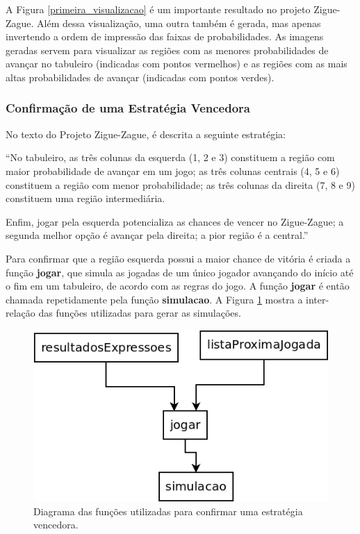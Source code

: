 \documentclass[12pt]{article}
\newcommand{\aspas}[1]{``#1''} %
\newcommand{\citacao}[1]{
	\singlespacing %
	\begin{flushright}
		\begin{minipage}{0.75\linewidth} %
			{\fontsize{10}{\baselineskip}\selectfont \aspas{#1}}
		\end{minipage}
	\end{flushright}
	\onehalfspacing %
}
\begin{document}
A Figura \ref{primeira_visualizacao} é um importante resultado no projeto Zigue-Zague. Além dessa visualização, uma outra também é gerada, mas apenas invertendo a ordem de impressão das faixas de probabilidades. As imagens geradas servem para visualizar as regiões com as menores probabilidades de avançar no tabuleiro (indicadas com pontos vermelhos) e as regiões com as mais altas probabilidades de avançar (indicadas com pontos verdes).

\subsubsection{Confirmação de uma Estratégia Vencedora}
\label{confirmacao}

No texto do Projeto Zigue-Zague, é descrita a seguinte estratégia:

\citacao{No tabuleiro, as três colunas da esquerda (1, 2 e 3) constituem a região com maior probabilidade de avançar em um jogo; as três colunas centrais (4, 5 e 6) constituem a região com menor probabilidade; as três colunas da direita (7, 8 e 9) constituem uma região intermediária.

Enfim, jogar pela esquerda potencializa as chances de vencer no Zigue-Zague; a segunda melhor opção é avançar pela direita; a pior região é a central.}

Para confirmar que a região esquerda possui a maior chance de vitória é criada a função \textbf{jogar}, que simula as jogadas de um único jogador avançando do início até o fim em um tabuleiro, de acordo com as regras do jogo. A função \textbf{jogar} é então chamada repetidamente pela função \textbf{simulacao}. A Figura \ref{confirmacao_regiao_vencedora} mostra a inter-relação das funções utilizadas para gerar as simulações.

\begin{figure}[ht!]
	\centering
	\includegraphics[width=0.55\linewidth]{img/confirmacao_regiao_vencedora.png}
	\caption{Diagrama das funções utilizadas para confirmar uma estratégia vencedora.}
	\label{confirmacao_regiao_vencedora}
\end{figure}
\end{document}
